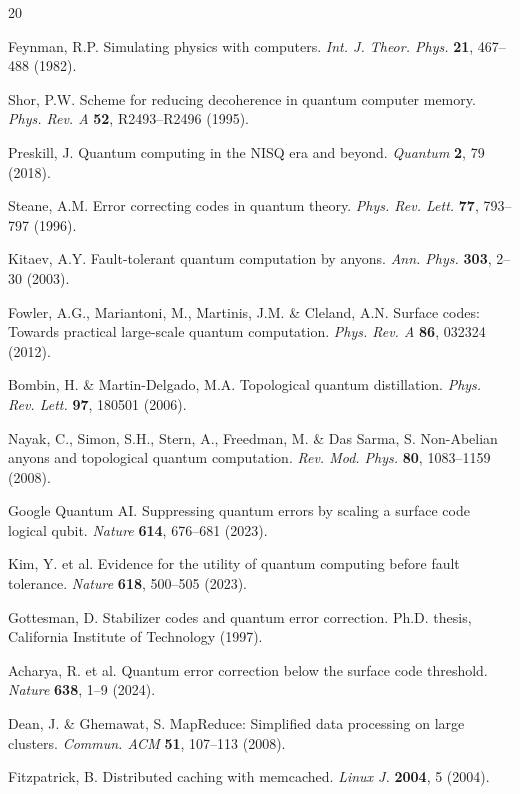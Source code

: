 \documentclass[12pt,a4paper]{article}
\theoremstyle{definition}
\begin{document}
\begin{thebibliography}{20}

Feynman, R.P. Simulating physics with computers. \textit{Int. J. Theor. Phys.} \textbf{21}, 467--488 (1982).

Shor, P.W. Scheme for reducing decoherence in quantum computer memory. \textit{Phys. Rev. A} \textbf{52}, R2493--R2496 (1995).

Preskill, J. Quantum computing in the NISQ era and beyond. \textit{Quantum} \textbf{2}, 79 (2018).

Steane, A.M. Error correcting codes in quantum theory. \textit{Phys. Rev. Lett.} \textbf{77}, 793--797 (1996).

Kitaev, A.Y. Fault-tolerant quantum computation by anyons. \textit{Ann. Phys.} \textbf{303}, 2--30 (2003).

Fowler, A.G., Mariantoni, M., Martinis, J.M. \& Cleland, A.N. Surface codes: Towards practical large-scale quantum computation. \textit{Phys. Rev. A} \textbf{86}, 032324 (2012).

Bombin, H. \& Martin-Delgado, M.A. Topological quantum distillation. \textit{Phys. Rev. Lett.} \textbf{97}, 180501 (2006).

Nayak, C., Simon, S.H., Stern, A., Freedman, M. \& Das Sarma, S. Non-Abelian anyons and topological quantum computation. \textit{Rev. Mod. Phys.} \textbf{80}, 1083--1159 (2008).

Google Quantum AI. Suppressing quantum errors by scaling a surface code logical qubit. \textit{Nature} \textbf{614}, 676--681 (2023).

Kim, Y. et al. Evidence for the utility of quantum computing before fault tolerance. \textit{Nature} \textbf{618}, 500--505 (2023).

Gottesman, D. Stabilizer codes and quantum error correction. Ph.D. thesis, California Institute of Technology (1997).

Acharya, R. et al. Quantum error correction below the surface code threshold. \textit{Nature} \textbf{638}, 1--9 (2024).

Dean, J. \& Ghemawat, S. MapReduce: Simplified data processing on large clusters. \textit{Commun. ACM} \textbf{51}, 107--113 (2008).

Fitzpatrick, B. Distributed caching with memcached. \textit{Linux J.} \textbf{2004}, 5 (2004).


\end{thebibliography}
\end{document}
